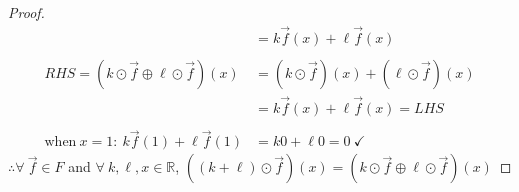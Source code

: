 \documentclass{article}
\newcommand{\bb}{\mathbb}
\begin{document}
\begin{enumerate}
\begin{proof}
\begin{align*}
                                                           & = k\vec{f}(x) + \ell\vec{f}(x)                   \\ \\
      RHS = (k \odot \vec{f} \oplus \ell \odot \vec{f})(x) & = (k \odot \vec{f})(x) + (\ell \odot \vec{f})(x) \\
                                                           & = k\vec{f}(x) + \ell\vec{f}(x) = LHS             \\ \\
      \text{when}~x=1:~k\vec{f}(1) + \ell\vec{f}(1)        & = k0 + \ell0 = 0~\checkmark
    \end{align*}
    $\therefore \forall~\vec{f} \in F$ and $\forall~k, \ell, x \in \bb{R}$, $((k + \ell) \odot \vec{f})(x) = (k \odot \vec{f} \oplus \ell \odot \vec{f})(x)$
  \end{proof}
\end{enumerate}
\end{document}
